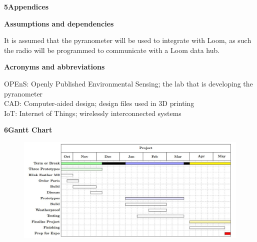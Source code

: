 \documentclass[10pt,draftclsnofoot,onecolumn,letterpaper]{article}
\begin{document}
{\fontsize{12pt}{12.0pt} \textbf{5\quad Appendices}\\\selectfont 
\par}\par
{\fontsize{10pt}{12.0pt} \textbf{Assumptions and dependencies}\\\selectfont 
\par}\par
{\fontsize{10pt}{12.0pt} It is assumed that the pyranometer will be used to integrate with Loom, as such the radio will be programmed to communicate with a Loom data hub.\\\selectfont 
\par}\par

{\fontsize{10pt}{12.0pt} \textbf{Acronyms and abbreviations}\\\selectfont 
\par}\par
{\fontsize{10pt}{12.0pt} OPEnS: Openly Published Environmental Sensing; the lab that is developing the pyranometer\\CAD: Computer-aided design; design files used in 3D printing\\IoT: Internet of Things; wirelessly interconnected systems\\\selectfont 
\par}\par
\pagebreak
{\fontsize{12pt}{12.0pt} \textbf{6\quad Gantt Chart}\\\selectfont 
\par}\par

\begin{figure}[h]
    \centering
    \includegraphics[natwidth=1030,natheight=466]{ganttchart.JPG}
\end{figure}
\end{document}
